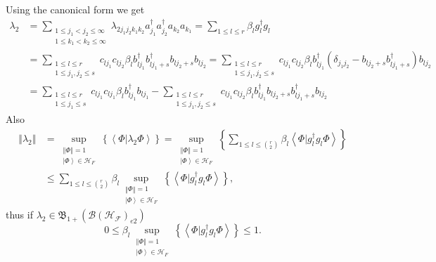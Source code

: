 \documentclass[aps,preprint]{revtex4}%
\begin{document}
Using the canonical form we get%
\begin{align}
\lambda_{2}  &  =\sum_{\substack{1\leq j_{1}<j_{2}\leq\infty\\1\leq
k_{1}<k_{2}\leq\infty}}\lambda_{2j_{1}j_{2}k_{1}k_{2}}a_{j_{1}}^{\dagger
}a_{j_{2}}^{\dagger}a_{k_{2}}a_{k_{1}}=\sum_{1\leq l\leq r}\beta_{l}%
g_{l}^{\dagger}g_{l}\nonumber\\
&  =\sum_{\substack{1\leq l\leq r\\1\leq j_{1},j_{2}\leq s}}c_{lj_{1}%
}c_{lj_{2}}\beta_{l}b_{lj_{1}}^{\dagger}b_{lj_{1}+s}^{\dagger}b_{lj_{2}%
+s}b_{lj_{2}}=\sum_{\substack{1\leq l\leq r\\1\leq j_{1},j_{2}\leq
s}}c_{lj_{1}}c_{lj_{2}}\beta_{l}b_{lj_{1}}^{\dagger}\left(  \delta_{j_{1}%
j_{2}}-b_{lj_{2}+s}b_{lj_{1}+s}^{\dagger}\right)  b_{lj_{2}}\nonumber\\
&  =\sum_{\substack{1\leq l\leq r\\1\leq j_{1}\leq s}}c_{lj_{1}}c_{lj_{1}%
}\beta_{l}b_{lj_{1}}^{\dagger}b_{lj_{1}}-\sum_{\substack{1\leq l\leq r\\1\leq
j_{1},j_{2}\leq s}}c_{lj_{1}}c_{lj_{2}}\beta_{l}b_{lj_{1}}^{\dagger}%
b_{lj_{2}+s}b_{lj_{1}+s}^{\dagger}b_{lj_{2}}%
\end{align}
Also
\begin{align}
\left\Vert \lambda_{2}\right\Vert  &  =\sup_{\substack{\left\Vert
\Phi\right\Vert =1\\\left\vert \Phi\right\rangle \in\mathcal{H}_{F}}}\left\{
\left\langle \left.  \Phi\right\vert \lambda_{2}\Phi\right\rangle \right\}
=\sup_{\substack{\left\Vert \Phi\right\Vert =1\\\left\vert \Phi\right\rangle
\in\mathcal{H}_{F}}}\left\{  \sum_{1\leq l\leq\binom{r}{2}}\beta
_{l}\left\langle \left.  \Phi\right\vert g_{l}^{\dagger}g_{l}\Phi\right\rangle
\right\} \nonumber\\
&  \leq\sum_{1\leq l\leq\binom{r}{2}}\beta_{l}\sup_{\substack{\left\Vert
\Phi\right\Vert =1\\\left\vert \Phi\right\rangle \in\mathcal{H}_{F}}}\left\{
\left\langle \left.  \Phi\right\vert g_{l}^{\dagger}g_{l}\Phi\right\rangle
\right\}  ,
\end{align}
thus if $\lambda_{2}\in\mathfrak{B}_{1+}\left(  \mathcal{B}\left(
\mathcal{H}_{\mathcal{F}}\right)  _{e2}\right)  $
\begin{equation}
0\leq\beta_{l}\sup_{\substack{\left\Vert \Phi\right\Vert =1\\\left\vert
\Phi\right\rangle \in\mathcal{H}_{F}}}\left\{  \left\langle \left.
\Phi\right\vert g_{l}^{\dagger}g_{l}\Phi\right\rangle \right\}  \leq1.
\end{equation}
\end{document}
